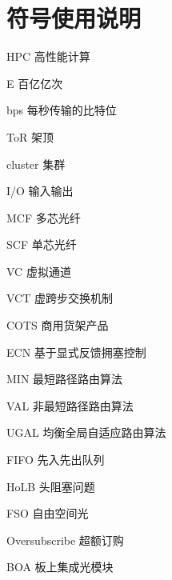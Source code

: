 \chapter*{符号使用说明}

\begin{denotation}

\item[HPC] 高性能计算
\item[E] 百亿亿次
\item[bps] 每秒传输的比特位
\item[ToR] 架顶
\item[cluster] 集群
\item[I/O] 输入输出
\item[MCF] 多芯光纤
\item[SCF] 单芯光纤
\item[VC] 虚拟通道
\item[VCT] 虚跨步交换机制
\item[COTS] 商用货架产品
\item[ECN] 基于显式反馈拥塞控制
\item[MIN] 最短路径路由算法
\item[VAL] 非最短路径路由算法
\item[UGAL] 均衡全局自适应路由算法
\item[FIFO] 先入先出队列
\item[HoLB] 头阻塞问题
\item[FSO] 自由空间光
\item[Oversubscribe] 超额订购
\item[BOA] 板上集成光模块

\end{denotation}
